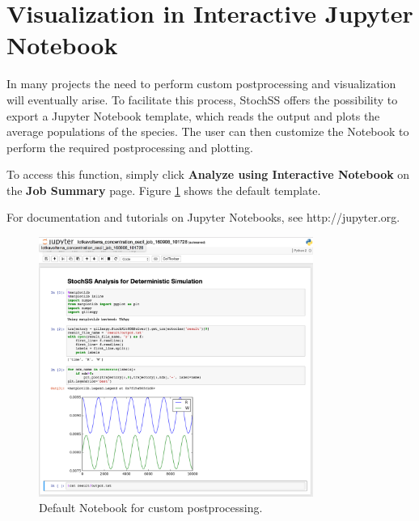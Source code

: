 \section{Visualization in Interactive Jupyter Notebook}

In many projects the need to perform custom postprocessing and visualization will eventually arise. To facilitate this process, StochSS offers the possibility to export a Jupyter Notebook template, which reads the output and plots the average populations of the species. The user can then customize the Notebook to perform the required postprocessing and plotting.

To access this function, simply click \textbf{Analyze using Interactive Notebook} on the \textbf{Job Summary} page. Figure \ref{vis-jupyter} shows the default template.

For documentation and tutorials on Jupyter Notebooks, see http://jupyter.org.

\begin{figure}[!ht]
\centering
\includegraphics[width=0.8\textwidth]{Vis/vis-jupyter.png}
\caption{\label{vis-jupyter}Default Notebook for custom postprocessing.}
\end{figure}


